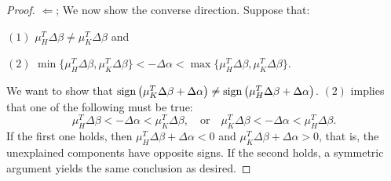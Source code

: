 \begin{proof}
$\Leftarrow$; We now show the converse direction. Suppose that:

$(1)$ $\mu_H^T \Delta\beta \neq \mu_K^T \Delta\beta$ and 

$(2)$ $\min\{\mu_H^T \Delta\beta, \mu_K^T \Delta\beta\} < -\Delta\alpha < \max\{\mu_H^T \Delta\beta, \mu_K^T \Delta\beta\}$. 

We want to show that $\operatorname{sign}\left( \mu_K^T \Delta\beta + \Delta\alpha \right) \neq \operatorname{sign}\left( \mu_H^T \Delta\beta + \Delta\alpha \right)$.
$(2)$ implies that one of the following must be true:
\[
  \mu_H^T \Delta\beta < -\Delta\alpha < \mu_K^T \Delta\beta, \quad \text{or} \quad \mu_K^T \Delta\beta < -\Delta\alpha < \mu_H^T \Delta\beta.
\]
If the first one holds, then $\mu_H^T \Delta\beta + \Delta\alpha <0$ and $\mu_K^T \Delta\beta + \Delta\alpha >0$, that is, the unexplained components have opposite signs. If the second holds, a symmetric argument yields the same conclusion as desired. 


\end{proof}


